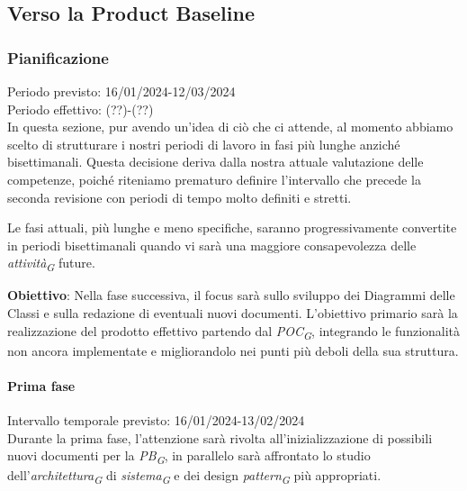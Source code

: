 \subsection{Verso la Product Baseline}

\subsubsection{Pianificazione}
Periodo previsto: 16/01/2024-12/03/2024\\ 
\vspace{0.2cm} 
Periodo effettivo: (??)-(??)\\ 
\vspace{0.2cm} 
In questa sezione, pur avendo un'idea di ciò che ci attende, al momento abbiamo scelto di strutturare i nostri periodi di lavoro in fasi più lunghe anziché bisettimanali. Questa decisione deriva dalla nostra attuale valutazione delle competenze, poiché riteniamo prematuro definire l'intervallo che precede la seconda revisione con periodi di tempo molto definiti e stretti.

Le fasi attuali, più lunghe e meno specifiche, saranno progressivamente convertite in periodi bisettimanali quando vi sarà una maggiore consapevolezza delle \textit{attività}\textsubscript{\textit{G}} future.

\vspace{0.2cm}

\textbf{Obiettivo}: Nella fase successiva, il focus sarà sullo sviluppo dei Diagrammi delle Classi e sulla redazione di eventuali nuovi documenti. L'obiettivo primario sarà la realizzazione del prodotto effettivo partendo dal \textit{POC}\textsubscript{\textit{G}}, integrando le funzionalità non ancora implementate e migliorandolo nei punti più deboli della sua struttura.

\paragraph{Prima fase}
Intervallo temporale previsto: 16/01/2024-13/02/2024\\ 
\vspace{0.2cm} 
Durante la prima fase, l'attenzione sarà rivolta all'inizializzazione di possibili nuovi documenti per la \textit{PB}\textsubscript{\textit{G}}, in parallelo sarà affrontato lo studio dell'\textit{architettura}\textsubscript{\textit{G}} di \textit{sistema}\textsubscript{\textit{G}} e dei design \textit{pattern}\textsubscript{\textit{G}} più appropriati.

